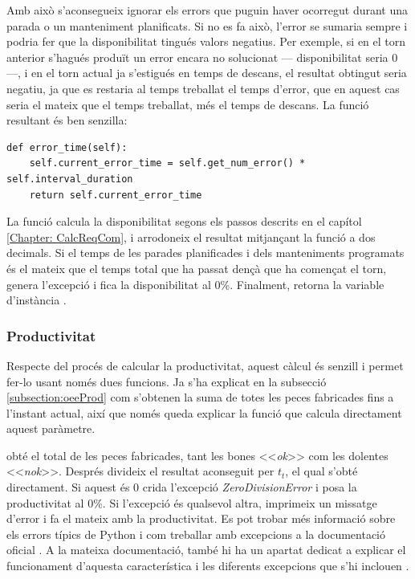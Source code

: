 \documentclass{tfgitic}[2022/06/30]
\begin{document}
Amb això s'aconsegueix ignorar els errors que puguin haver ocorregut durant una parada o un manteniment planificats. Si no es fa això, l'error se sumaria sempre i podria fer que la disponibilitat tingués valors negatius. Per exemple, si en el torn anterior s'hagués produït un error encara no solucionat --- disponibilitat seria $0$ ---, i en el torn actual ja s'estigués en temps de descans, el resultat obtingut seria negatiu, ja que es restaria al temps treballat el temps d'error, que en aquest cas seria el mateix que el temps treballat, més el temps de descans. La funció resultant és ben senzilla:

\begin{lstlisting}[style = Python]
def error_time(self):
    self.current_error_time = self.get_num_error() * self.interval_duration
    return self.current_error_time
\end{lstlisting}

La funció  calcula la disponibilitat segons els passos descrits en el capítol \ref{Chapter: CalcReqCom}, i arrodoneix el resultat mitjançant la funció  a dos decimals. Si el temps de les parades planificades i dels manteniments programats és el mateix que el temps total que ha passat dençà que ha començat el torn, genera l'excepció  i fica la disponibilitat al $0$\%. Finalment, retorna la variable d'instància .

\subsubsection{Productivitat}
Respecte del procés de calcular la productivitat, aquest càlcul és senzill i permet fer-lo usant només dues funcions. Ja s'ha explicat en la subsecció \ref{subsection:oeeProd} com s'obtenen la suma de totes les peces fabricades fins a l'instant actual, així que només queda explicar la funció que calcula directament aquest paràmetre.

 obté el total de les peces fabricades, tant les bones <<\emph{ok}>> com les dolentes <<\emph{nok}>>.  Després divideix el resultat aconseguit per $t_{t}$, el qual s'obté directament. Si aquest és $0$ crida l'excepció \emph{ZeroDivisionError} i posa la productivitat al $0$\%. Si l'excepció és qualsevol altra, imprimeix un missatge d'error i fa el mateix amb la productivitat. Es pot trobar més informació sobre els errors típics de Python i com treballar amb excepcions a la documentació oficial \cite{pythondoc:errorsAndExcpetions}. A la mateixa documentació, també hi ha un apartat dedicat a explicar el funcionament d'aquesta característica i les diferents excepcions que s'hi inclouen \cite{pythondoc:listExceptions}.
\end{document}
